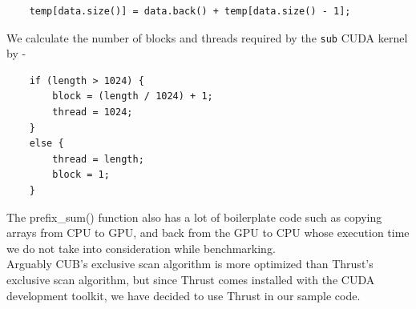 \documentclass{article}
\begin{document}
\begin{mdframed}[backgroundcolor=light-gray, roundcorner=10pt,leftmargin=0.5, rightmargin=0.5, innertopmargin=1,innerbottommargin=1, outerlinewidth=1, linecolor=light-gray]
\begin{lstlisting}
    temp[data.size()] = data.back() + temp[data.size() - 1];
\end{lstlisting}
\end{mdframed}
\noindent We calculate the number of blocks and threads required by the \texttt{sub} CUDA kernel by - 
\begin{mdframed}[backgroundcolor=light-gray, roundcorner=10pt,leftmargin=0.5, rightmargin=0.5, innertopmargin=1,innerbottommargin=1, outerlinewidth=1, linecolor=light-gray]
\begin{lstlisting}
    if (length > 1024) {
        block = (length / 1024) + 1;
        thread = 1024;
    }
    else {
        thread = length;
        block = 1;
    }
\end{lstlisting}
\end{mdframed}
The prefix\_sum() function also has a lot of boilerplate code such as copying arrays from CPU to GPU, and back from the GPU to CPU whose execution time we do not take into consideration while benchmarking.\\
\smallbreak
\noindent Arguably CUB's \cite{cub} exclusive scan algorithm is more optimized than Thrust's exclusive scan algorithm, but since Thrust comes installed with the CUDA development toolkit, we have decided to use Thrust in our sample code.

\pagebreak
\end{document}
